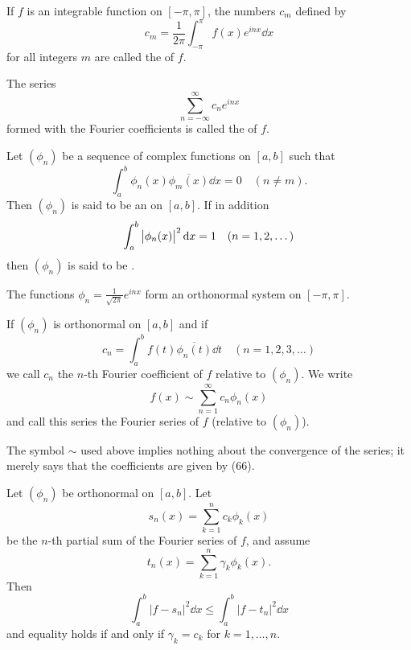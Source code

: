 \begin{definition}
If $f$ is an integrable function on $[-\pi,\pi]$, the numbers $c_m$ defined by
\[c_m=\frac{1}{2\pi}\int_{-\pi}^{\pi}f(x)e^{inx}\dd{x}\]
for all integers $m$ are called the  of $f$.
\end{definition}

\begin{definition}
The series
\[\sum_{n=-\infty}^{\infty}c_ne^{inx}\]
formed with the Fourier coefficients is called the  of $f$.
\end{definition}

\begin{definition}
Let $(\phi_n)$ be a sequence of complex functions on $[a,b]$ such that
\[\int_{a}^{b}\phi_n(x)\overline{\phi_m(x)}\dd{x}=0\quad(n\neq m).\]
Then $(\phi_n)$ is said to be an  on $[a,b]$. If in addition
\[\int_{a}^{b}\left|\phi_n(x)\right|^2\dd{x}=1\quad(n=1,2,\dots)\]
then $(\phi_n)$ is said to be .
\end{definition}

\begin{example}
The functions $\phi_n=\frac{1}{\sqrt{2\pi}}e^{inx}$ form an orthonormal system on $[-\pi,\pi]$.
\end{example}

If $(\phi_n)$ is orthonormal on $[a,b]$ and if
\[c_n=\int_{a}^{b}f(t)\overline{\phi_n(t)}\dd{t}\quad(n=1,2,3,\dots)\]
we call $c_n$ the $n$-th Fourier coefficient of $f$ relative to $(\phi_n)$. We write
\[f(x)\sim\sum_{n=1}^{\infty}c_n\phi_n(x)\]
and call this series the Fourier series of $f$ (relative to $(\phi_n)$).

\begin{remark}
The symbol $\sim$ used above implies nothing about the convergence of the series; it merely says that the coefficients are given by (66).
\end{remark} 

\begin{proposition}
Let $(\phi_n)$ be orthonormal on $[a,b]$. Let
\[s_n(x)=\sum_{k=1}^{n}c_k\phi_k(x)\]
be the $n$-th partial sum of the Fourier series of $f$, and assume
\[t_n(x)=\sum_{k=1}^{n}\gamma_k\phi_k(x).\]
Then
\[\int_{a}^{b}|f-s_n|^2\dd{x}\le\int_{a}^{b}|f-t_n|^2\dd{x}\]
and equality holds if and only if $\gamma_k=c_k$ for $k=1,\dots,n$.
\end{proposition}

